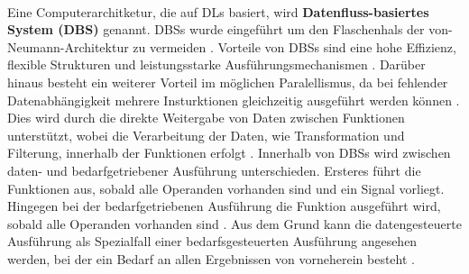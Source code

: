     \\
    Eine Computerarchitketur, die auf DLs basiert, wird \textbf{Datenfluss-basiertes System (DBS)} genannt.
    DBSs wurde eingeführt um den Flaschenhals der von-Neumann-Architektur zu vermeiden \cite{1}.
    Vorteile von DBSs sind eine hohe Effizienz, flexible Strukturen und leistungsstarke Ausführungsmechanismen \cite{1}.
    Darüber hinaus besteht ein weiterer Vorteil im möglichen Paralellismus, da bei fehlender Datenabhängigkeit mehrere Insturktionen gleichzeitig ausgeführt werden können \cite{1}.
    Dies wird durch die direkte Weitergabe von Daten zwischen Funktionen unterstützt, wobei die Verarbeitung der Daten, wie Transformation und Filterung, innerhalb der Funktionen erfolgt \cite{15}.
    Innerhalb von DBSs wird zwischen daten- und bedarfgetriebener Ausführung unterschieden. 
    Ersteres führt die Funktionen aus, sobald alle Operanden vorhanden sind und ein Signal vorliegt. 
    Hingegen bei der bedarfgetriebenen Ausführung die Funktion ausgeführt wird, sobald alle Operanden vorhanden sind \cite{2}.
    Aus dem Grund kann die datengesteuerte Ausführung als Spezialfall einer bedarfsgesteuerten Ausführung angesehen werden, bei der ein Bedarf an allen Ergebnissen von vorneherein besteht \cite{11}.
